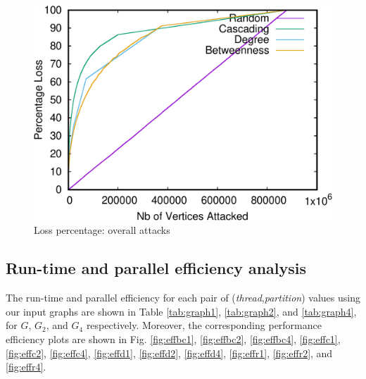 \begin{figure}
\centering
\includegraphics[scale=0.35]{bench/generated/loss-all-crop.pdf}
\caption{Loss percentage: overall attacks}
\label{fig:loss-all}
\end{figure}

\subsection{Run-time and parallel efficiency analysis}
The run-time and parallel efficiency for each pair of ({\it thread},{\it partition}) values using our input graphs are shown in Table \ref{tab:graph1}, \ref{tab:graph2}, and \ref{tab:graph4}, for $G$, $G_2$, and $G_4$ respectively. Moreover, the corresponding performance efficiency plots are shown in Fig. \ref{fig:effbc1}, \ref{fig:effbc2}, \ref{fig:effbc4}, \ref{fig:effc1}, \ref{fig:effc2}, \ref{fig:effc4}, \ref{fig:effd1}, \ref{fig:effd2}, \ref{fig:effd4}, \ref{fig:effr1}, \ref{fig:effr2}, and \ref{fig:effr4}.  

